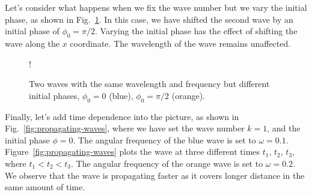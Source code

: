 Let's consider what happens when we fix the wave number but we vary the initial phase, as shown in Fig.~\ref{fig:phase-diff-waves}.
In this case, we have shifted the second wave by an initial phase of $\phi_0=\pi/2$.
Varying the initial phase has the effect of shifting the wave along the $x$ coordinate.
The wavelength of the wave remains unaffected.

\begin{figure}[t]
    \centering
    \resizebox {0.6\textwidth} {!} {
    }
    \caption[Same wavelength, different initial phase.]{Two waves with the same wavelength and frequency but different initial phases, $\phi_0 = 0$ (blue), $\phi_0=\pi/2$ (orange).}
    \label{fig:phase-diff-waves}
\end{figure}

Finally, let's add time dependence into the picture, as shown in Fig.~\ref{fig:propagating-waves}, where we have set the wave number $k=1$, and the initial phase $\phi=0$.
The angular frequency of the blue wave is set to $\omega=0.1$.
Figure~\ref{fig:propagating-waves} plots the wave at three different times $t_1$, $t_2$, $t_3$, where $t_1<t_2<t_3$.
The angular frequency of the orange wave is set to $\omega=0.2$.
We observe that the wave is propagating faster as it covers longer distance in the same amount of time.

